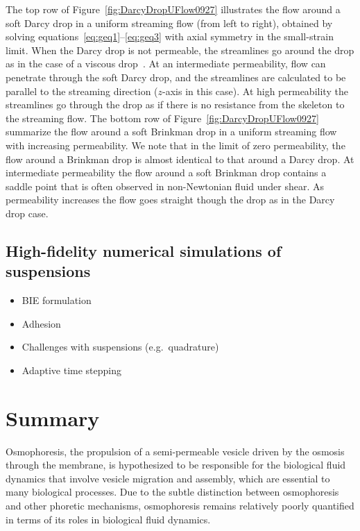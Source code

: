 \documentclass[11pt]{article}
\begin{document}
The top row of Figure~\ref{fig:DarcyDropUFlow0927} illustrates the flow
around a soft Darcy drop in a uniform streaming flow (from left to
right), obtained by solving equations~\eqref{eq:geq1}--\eqref{eq:geq3}
with axial symmetry in the small-strain limit. When the Darcy drop is
not permeable, the streamlines go around the drop as in the case of a
viscous drop~\cite{DavisStone1993_CES,
GLeal_AdvancedTransportPhenomena}. At an intermediate permeability, flow
can penetrate through the soft Darcy drop, and the streamlines are
calculated to be parallel to the streaming direction ($z$-axis in this
case). At high permeability the streamlines go through the drop as if
there is no resistance from the skeleton to the streaming flow.  The
bottom row of Figure~\ref{fig:DarcyDropUFlow0927} summarize the flow
around a soft Brinkman drop in a uniform streaming flow with increasing
permeability.  We note that in the limit of zero permeability, the flow
around a Brinkman drop is almost identical to that around a Darcy drop.
At intermediate permeability the flow around a soft Brinkman drop
contains a saddle point that is often observed in non-Newtonian fluid
under shear.  As permeability increases the flow goes straight though
the drop as in the Darcy drop case.

\subsection{High-fidelity numerical simulations of suspensions} 
\label{subsec:numerics}
\begin{itemize}
  \item BIE formulation
  \item Adhesion
  \item Challenges with suspensions (e.g.~quadrature)
  \item Adaptive time stepping
\end{itemize}

\section{Summary}
\label{sec:summary}
Osmophoresis, the propulsion of a semi-permeable vesicle driven by the
osmosis through the membrane, is hypothesized to be responsible for the
biological fluid dynamics that involve vesicle migration and assembly,
which are essential to many biological processes.  Due to the subtle
distinction between osmophoresis and other phoretic mechanisms,
osmophoresis remains relatively poorly quantified in terms of its roles
in biological fluid dynamics. 
\end{document}
